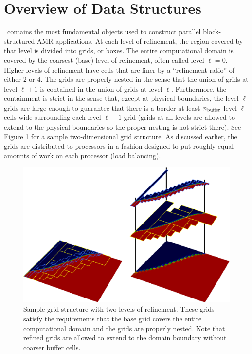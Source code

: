 \section{Overview of Data Structures}

\BoxLib\ contains the most fundamental objects used to construct parallel
block-structured AMR applications.
At each level of refinement, the region covered by that level is divided
into grids, or boxes.  The entire computational domain is covered by
the coarsest (base) level of refinement, often called level $\ell=0$. 
Higher levels of refinement have cells that are finer by a ``refinement ratio''
of either 2 or 4.  The grids are properly nested in the sense that the union 
of grids at level $\ell+1$ is contained in the union of grids at level $\ell$.
Furthermore, the containment is strict in the sense that, except at physical 
boundaries, the level $\ell$ grids are large enough to guarantee that there is
a border at least $n_{\rm buffer}$ level $\ell$ cells wide surrounding each level
$\ell +1$ grid (grids at all levels are allowed to extend to the physical
boundaries so the proper nesting is not strict there).  See Figure \ref{fig:AMR}
for a sample two-dimensional grid structure.
As discussed earlier, the grids are distributed to processors in
a fashion designed to put roughly equal amounts of work on each
processor (load balancing).
\begin{figure}[tb]
\centering
\includegraphics[width=6in]{./Introduction/AMR}
\caption{\label{fig:AMR}Sample grid structure with two levels of refinement.  These
grids satisfy the requirements that the base grid covers the entire computational domain 
and the grids are properly nested.  Note that refined grids are allowed to extend to the
domain boundary without coarser buffer cells.}
\end{figure}

